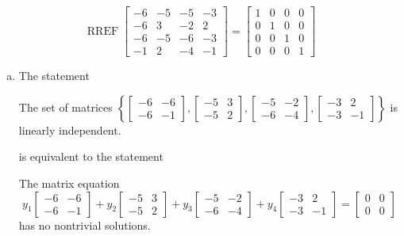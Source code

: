 \begin{exerciseAnswer} 


\[\operatorname{RREF} \left[\begin{array}{cccc}
-6 & -5 & -5 & -3 \\
-6 & 3 & -2 & 2 \\
-6 & -5 & -6 & -3 \\
-1 & 2 & -4 & -1
\end{array}\right] = \left[\begin{array}{cccc}
1 & 0 & 0 & 0 \\
0 & 1 & 0 & 0 \\
0 & 0 & 1 & 0 \\
0 & 0 & 0 & 1
\end{array}\right] \]


\begin{enumerate}[(a)]
\item The statement 
\begin{center}\begin{minipage}{0.8\textwidth}
 The set of matrices \( \left\{ \left[\begin{array}{cc}
-6 & -6 \\
-6 & -1
\end{array}\right] , \left[\begin{array}{cc}
-5 & 3 \\
-5 & 2
\end{array}\right] , \left[\begin{array}{cc}
-5 & -2 \\
-6 & -4
\end{array}\right] , \left[\begin{array}{cc}
-3 & 2 \\
-3 & -1
\end{array}\right] \right\} \) is linearly independent.
\end{minipage}\end{center}
     is equivalent to the statement 
\begin{center}\begin{minipage}{0.8\textwidth}
 The matrix equation \[ y_{1} \left[\begin{array}{cc}
-6 & -6 \\
-6 & -1
\end{array}\right] + y_{2} \left[\begin{array}{cc}
-5 & 3 \\
-5 & 2
\end{array}\right] + y_{3} \left[\begin{array}{cc}
-5 & -2 \\
-6 & -4
\end{array}\right] + y_{4} \left[\begin{array}{cc}
-3 & 2 \\
-3 & -1
\end{array}\right] = \left[\begin{array}{cc}
0 & 0 \\
0 & 0
\end{array}\right] \] has no nontrivial solutions. 
\end{minipage}\end{center}
    

\end{enumerate}
\end{exerciseAnswer}
